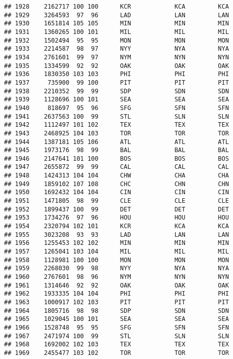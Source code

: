 \documentclass[]{article}
\begin{document}
\begin{verbatim}
## 1928    2162717 100 100      KCR            KCA         KCA
## 1929    3264593  97  96      LAD            LAN         LAN
## 1930    1651814 105 105      MIN            MIN         MIN
## 1931    1360265 100 101      MIL            MIL         MIL
## 1932    1502494  95  95      MON            MON         MON
## 1933    2214587  98  97      NYY            NYA         NYA
## 1934    2761601  99  97      NYM            NYN         NYN
## 1935    1334599  92  92      OAK            OAK         OAK
## 1936    1830350 103 103      PHI            PHI         PHI
## 1937     735900  99 100      PIT            PIT         PIT
## 1938    2210352  99  99      SDP            SDN         SDN
## 1939    1128696 100 101      SEA            SEA         SEA
## 1940     818697  95  96      SFG            SFN         SFN
## 1941    2637563 100  99      STL            SLN         SLN
## 1942    1112497 101 102      TEX            TEX         TEX
## 1943    2468925 104 103      TOR            TOR         TOR
## 1944    1387181 105 106      ATL            ATL         ATL
## 1945    1973176  98  99      BAL            BAL         BAL
## 1946    2147641 101 100      BOS            BOS         BOS
## 1947    2655872  99  99      CAL            CAL         CAL
## 1948    1424313 104 104      CHW            CHA         CHA
## 1949    1859102 107 108      CHC            CHN         CHN
## 1950    1692432 104 104      CIN            CIN         CIN
## 1951    1471805  98  99      CLE            CLE         CLE
## 1952    1899437 100  99      DET            DET         DET
## 1953    1734276  97  96      HOU            HOU         HOU
## 1954    2320794 102 101      KCR            KCA         KCA
## 1955    3023208  93  93      LAD            LAN         LAN
## 1956    1255453 102 102      MIN            MIN         MIN
## 1957    1265041 103 104      MIL            MIL         MIL
## 1958    1128981 100 100      MON            MON         MON
## 1959    2268030  99  98      NYY            NYA         NYA
## 1960    2767601  98  96      NYM            NYN         NYN
## 1961    1314646  92  92      OAK            OAK         OAK
## 1962    1933335 104 104      PHI            PHI         PHI
## 1963    1000917 102 103      PIT            PIT         PIT
## 1964    1805716  98  98      SDP            SDN         SDN
## 1965    1029045 100 101      SEA            SEA         SEA
## 1966    1528748  95  95      SFG            SFN         SFN
## 1967    2471974 100  99      STL            SLN         SLN
## 1968    1692002 102 103      TEX            TEX         TEX
## 1969    2455477 103 102      TOR            TOR         TOR

\end{verbatim}
\end{document}

